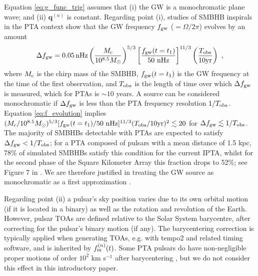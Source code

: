 \documentclass[fleqn,usenatbib,useAMS]{mnras}
\begin{document}
\noindent Equation \eqref{eq:g_func_trig} assumes that (i) the GW is a monochromatic plane wave; and (ii) $\boldsymbol{q}^{(n)}$ is constant. Regarding point (i), studies of SMBHB inspirals in the PTA context show that the GW frequency $f_{\rm gw}$ ($=\Omega / 2 \pi $) evolves by an amount \citep[e.g.][]{Sesana2010}
\begin{equation}
	\Delta f_{\rm gw} = 0.05 \, \mathrm{nHz}\left(\frac{M_{\rm c}}{10^{8.5} M_{\odot}}\right)^{5 / 3}\left[\frac{f_{\rm gw}(t=t_1)}{50 \mathrm{~nHz}}\right]^{11 / 3}\left(\frac{T_{\mathrm{obs}}}{10 \mathrm{yr}}\right) \ ,
	\label{eq:f_evolution}
\end{equation}
where $M_{\rm c}$ is the chirp mass of the SMBHB, $f_{\rm gw}(t=t_1)$ is the GW frequency at the time of the first observation, and $T_{\rm obs}$ is the length of time over which $\Delta f_{\rm gw}$ is measured, which for PTAs is $\sim 10$ years. A source can be considered monochromatic if $\Delta f_{\rm gw}$ is less than the PTA frequency resolution $1/T_{\rm obs}$. Equation \eqref{eq:f_evolution} implies $(M_{\rm c}/10^{8.5} M_{\odot})^{5/3} [ f_{\rm gw}(t=t_1) / 50 \mathrm{~nHz}]^{11/3} (T_{\rm obs}/10 \mathrm{yr})^2 \lesssim 20$ for $\Delta f_{\rm gw} \lesssim 1/T_{\rm obs}$. The majority of SMBHBs detectable with PTAs are expected to satisfy $\Delta f_{\rm gw} < 1/T_{\rm obs}$; for a PTA composed of pulsars with a mean distance of 1.5 kpc, 78\% of simulated SMBHBs satisfy this condition for the current IPTA, whilst for the second phase of the Square Kilometer Array this fraction drops to 52\%; see Figure 7 in  \cite{Rosado10.1093/mnras/stv1098}. We are therefore justified in treating the GW source as monochromatic as a first approximation \citep{Sesana10,Sesana2010,Ellis2012ApJ}. \newline 


Regarding point (ii) a pulsar's sky position varies due to its own orbital motion (if it is located in a binary) as well as the rotation and revolution of the Earth. However, pulsar TOAs are defined relative to the Solar System barycentre, after correcting for the pulsar's binary motion (if any). The barycentering correction is typically applied when generating TOAs, e.g. with {\sc tempo2} \citep{tempo2,edwardstempo} and related timing software, and is inherited by $f_{\rm m}^{(n)}(t)$. Some PTA pulsars do have non-negligible proper motions of order $10^2$ km s$^{-1}$ after barycentering \citep[e.g.][]{10.1093/mnras/sty3390}, but we do not consider this effect in this introductory paper. 
\end{document}
